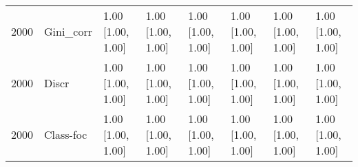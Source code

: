 \begin{table}[ht]
\begin{tabular}{rlllllll}
  2000 & Gini\_corr & 1.00 [1.00, 1.00] & 1.00 [1.00, 1.00] & 1.00 [1.00, 1.00] & 1.00 [1.00, 1.00] & 1.00 [1.00, 1.00] & 1.00 [1.00, 1.00] \\ 
  2000 & Discr & 1.00 [1.00, 1.00] & 1.00 [1.00, 1.00] & 1.00 [1.00, 1.00] & 1.00 [1.00, 1.00] & 1.00 [1.00, 1.00] & 1.00 [1.00, 1.00] \\ 
  2000 & Class-foc & 1.00 [1.00, 1.00] & 1.00 [1.00, 1.00] & 1.00 [1.00, 1.00] & 1.00 [1.00, 1.00] & 1.00 [1.00, 1.00] & 1.00 [1.00, 1.00] \\ 
   \hline
\end{tabular}
\end{table}
